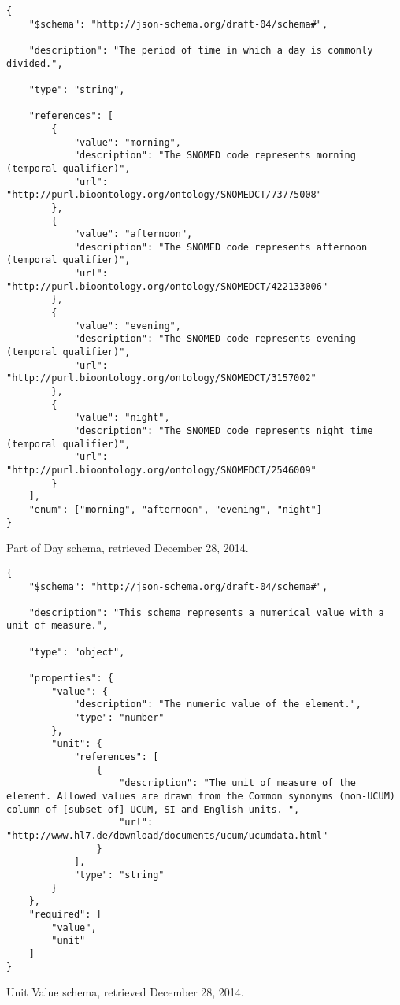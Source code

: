 

\begin{listing}
\begin{verbatim}
{
    "$schema": "http://json-schema.org/draft-04/schema#",

    "description": "The period of time in which a day is commonly divided.",

    "type": "string",

    "references": [
        {
            "value": "morning",
            "description": "The SNOMED code represents morning (temporal qualifier)",
            "url": "http://purl.bioontology.org/ontology/SNOMEDCT/73775008"
        },
        {
            "value": "afternoon",
            "description": "The SNOMED code represents afternoon (temporal qualifier)",
            "url": "http://purl.bioontology.org/ontology/SNOMEDCT/422133006"
        },
        {
            "value": "evening",
            "description": "The SNOMED code represents evening (temporal qualifier)",
            "url": "http://purl.bioontology.org/ontology/SNOMEDCT/3157002"
        },
        {
            "value": "night",
            "description": "The SNOMED code represents night time (temporal qualifier)",
            "url": "http://purl.bioontology.org/ontology/SNOMEDCT/2546009"
        }
    ],
    "enum": ["morning", "afternoon", "evening", "night"]
}
\end{verbatim}
\caption{Part of Day schema, retrieved December 28, 2014.} 
\label{listing:part-of-day-json}
\end{listing}


\begin{listing}
\begin{verbatim}
{
    "$schema": "http://json-schema.org/draft-04/schema#",

    "description": "This schema represents a numerical value with a unit of measure.",

    "type": "object",

    "properties": {
        "value": {
            "description": "The numeric value of the element.",
            "type": "number"
        },
        "unit": {
            "references": [
                {
                    "description": "The unit of measure of the element. Allowed values are drawn from the Common synonyms (non-UCUM) column of [subset of] UCUM, SI and English units. ",
                    "url": "http://www.hl7.de/download/documents/ucum/ucumdata.html"
                }
            ],
            "type": "string"
        }
    },
    "required": [
        "value",
        "unit"
    ]
}
\end{verbatim}
\caption{Unit Value schema, retrieved December 28, 2014.} 
\label{listing:unit-value-json}
\end{listing}
        
